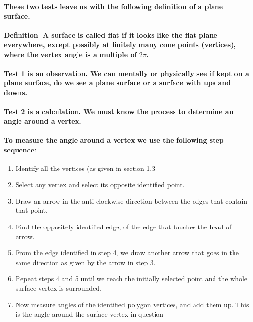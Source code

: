 \documentclass{report}
\begin{document}
\paragraph{These two tests leave us with the following definition of a plane surface.}



\paragraph{\textbf{Definition.} A surface is called flat if it looks like the flat plane everywhere, except possibly at finitely many cone points (vertices), where the vertex angle is a multiple of $2\pi$.}

\paragraph{Test 1 is an observation. We can mentally or physically see if kept on a plane surface, do we see a plane surface or a surface with ups and downs.}

\paragraph{Test 2 is a calculation. We must know the process to determine an angle around a vertex.}

\paragraph{To measure the angle around a vertex we use the following step sequence:}

\begin{enumerate}
\item  {Identify all the vertices (as given in section 1.3}

\item  {Select any vertex and select its opposite identified point.}

\item  {Draw an arrow in the anti-clockwise direction between the edges that contain that point.}

\item  {Find the oppositely identified edge, of the edge that touches the head of arrow.}

\item  {From the edge identified in step 4, we draw another arrow that goes in the same direction as given by the arrow in step 3.}

\item  {Repeat steps 4 and 5 until we reach the initially selected point and the whole surface vertex is surrounded.}

\item  {Now measure angles of the identified polygon vertices, and add them up. This is the angle around the surface vertex in question}
\end{enumerate}
\end{document}
